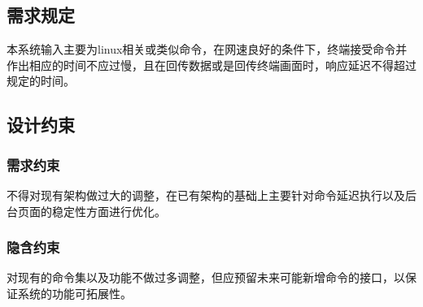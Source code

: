 \documentclass[UTF8]{ctexart}
\newcommand{\note}[1]{\textcolor{blue}{\emph{[#1]}}}   %
\begin{document}
    \subsection{需求规定} 
    \par{本系统输入主要为linux相关或类似命令，在网速良好的条件下，终端接受命令并作出相应的时间不应过慢，且在回传数据或是回传终端画面时，响应延迟不得超过规定的时间。}
    \subsection{设计约束}
     \subsubsection{需求约束}
     \par{不得对现有架构做过大的调整，在已有架构的基础上主要针对命令延迟执行以及后台页面的稳定性方面进行优化。}
     \subsubsection{隐含约束}
     \par{对现有的命令集以及功能不做过多调整，但应预留未来可能新增命令的接口，以保证系统的功能可拓展性。} 
\end{document}

